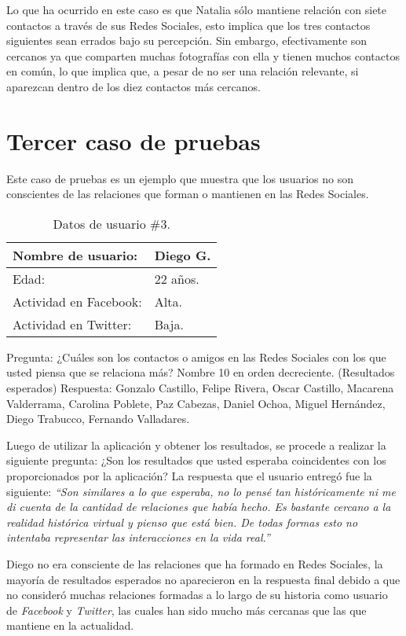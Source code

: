 Lo que ha ocurrido en este caso es que Natalia sólo mantiene relación con siete contactos a través de sus Redes Sociales, esto implica que los tres contactos siguientes sean errados bajo su percepción. Sin embargo, efectivamente son cercanos ya que comparten muchas fotografías con ella y tienen muchos contactos en común, lo que implica que, a pesar de no ser una relación relevante, si aparezcan dentro de los diez contactos más cercanos.

\section{Tercer caso de pruebas}

Este caso de pruebas es un ejemplo que muestra que los usuarios no son conscientes de las relaciones que forman o mantienen en las Redes Sociales.

\begin{table}[H]
\begin{center}
\caption[Datos de usuario \#3.]{Datos de usuario \#3.}
\label{tab:anexo-tab3}
\begin{tabular}{|l|>{\raggedright}p{4cm}|}
\hline 
Nombre de usuario: & Diego G.\tabularnewline
\hline 
\hline 
Edad: & 22 años.\tabularnewline
\hline 
Actividad en Facebook: & Alta.\tabularnewline
\hline 
Actividad en Twitter: & Baja.\tabularnewline
\hline 
\end{tabular}
\end{center}
\end{table}

Pregunta: ¿Cuáles son los contactos o amigos en las Redes Sociales con los que usted piensa que se relaciona más? Nombre 10 en orden decreciente. (Resultados esperados)
Respuesta: Gonzalo Castillo, Felipe Rivera, Oscar Castillo, Macarena Valderrama, Carolina Poblete, Paz Cabezas, Daniel Ochoa, Miguel Hernández, Diego Trabucco, Fernando Valladares.

Luego de utilizar la aplicación y obtener los resultados, se procede a realizar la siguiente pregunta: ¿Son los resultados que usted esperaba coincidentes con los proporcionados por la aplicación? La respuesta que el usuario entregó fue la siguiente: \textit{“Son similares a lo que esperaba, no lo pensé tan históricamente ni me di cuenta de la cantidad de relaciones que había hecho. Es bastante cercano a la realidad histórica virtual y pienso que está bien. De todas formas esto no intentaba representar las interacciones en la vida real.”}

Diego no era consciente de las relaciones que ha formado en Redes Sociales, la mayoría de resultados esperados no aparecieron en la respuesta final debido a que no consideró muchas relaciones formadas a lo largo de su historia como usuario de \textit{Facebook} y \textit{Twitter}, las cuales han sido mucho más cercanas que las que mantiene en la actualidad.